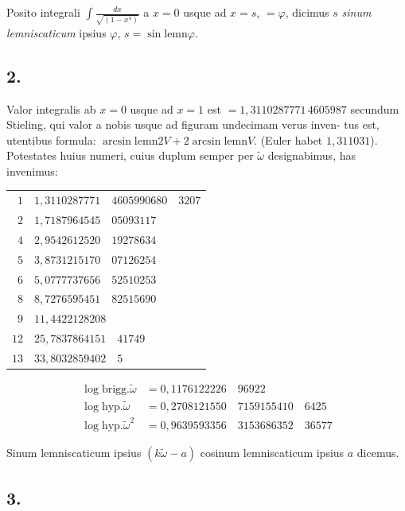 \documentclass[10pt,a4paper]{article}
\newcommand{\lemn}{\text{lemn}}
\newcommand{\sinlemn}{\sin\lemn}
\newcommand{\arcsinlemn}{\arcsin\lemn}
\begin{document}
Posito integrali $\int\!\frac{dx}{\sqrt{(1-x^4)}}$ a $x=0$ usque ad $x=s$, $=\varphi$, dicimus $s$
\textit{sinum lemniscaticum} ipsius $\varphi$, $s=\sinlemn\varphi$.

\subsection*{2.}

Valor integralis ab $x=0$ usque ad $x=1$ est $= 1{,}3110287771\,4605987$
secundum Stie\-ling, qui valor a nobis usque ad figuram undecimam verus inven-
tus est, utentibus formula: $\arcsinlemn 2V + 2\arcsinlemn V$. (Euler habet
$1{,}311031$). Potestates huius numeri, cuius duplum semper per $\tilde{\omega}$ designabimus,
has invenimus:

\begin{center}
\begin{tabular}{r@{\quad\ldots\quad}l}
$1$ & $1{,}3110287771\quad 4605990680\quad 3207$\\
$2$ & $1{,}7187964545\quad 05093117$\\
$4$ & $2{,}9542612520\quad 19278634$\\
$5$ & $3{,}8731215170\quad 07126254$\\
$6$ & $5{,}0777737656\quad 52510253$\\
$8$ & $8{,}7276595451\quad 82515690$\\
$9$ & $11{,}4422128208$\\
$12$ & $25{,}7837864151\quad 41749$\\
$13$ & $33{,}8032859402\quad 5$
\end{tabular}
\end{center}

\begin{align*}
\log\text{brigg.}\tilde{\omega} &= 0{,}1176122226\quad 96922\\
\log\text{hyp.}\tilde{\omega} &= 0{,}2708121550\quad 7159155410\quad 6425\\
\log\text{hyp.}\tilde{\omega}^2 &= 0{,}9639593356\quad 3153686352\quad 36577
\end{align*}

Sinum lemniscaticum ipsius $(k\tilde{\omega}-a)$ cosinum lemniscaticum ipsius $a$
dicemus.

\subsection*{3.}
\end{document}
